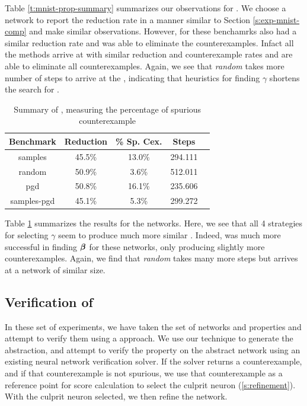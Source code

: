 Table \ref{t:mnist-prop-summary} summarizes our observations for \mnist. We
choose a network to report the reduction rate in a manner similar to Section
\ref{s:exp-mnist-comp} and make similar observations. However, for these benchamrks 
\pgd also had a similar reduction rate and was able to eliminate the
counterexamples. Infact all the methods arrive at
\abs with similar reduction and counterexample rates and are able to eliminate all
counterexamples. Again, we see that \textit{random} takes more number of steps
to arrive at the \abs, indicating that heuristics for finding $\gamma$ shortens
the search for \abs.

\begin{table}
\begin{tabular}{|c|c|c|c|c|}
\hline
Benchmark   & Reduction  & \% Sp. Cex. & Steps    \\
\hline
samples     & 45.5\%     &  13.0\%     & 294.111  \\
random      & 50.9\%     &  3.6\%      & 512.011  \\
pgd         & 50.8\%     &  16.1\%     & 235.606  \\
samples-pgd & 45.1\%     &  5.3\%      & 299.272  \\
\hline
\end{tabular}
\caption{Summary of \acasxu, measuring the percentage of spurious counterexample }
\label{t:acas-ncex}
\end{table}

Table \ref{t:acas-ncex} summarizes the results for the \acasxu networks. Here,
we see that all 4 strategies for selecting $\gamma$ seem to produce much more
similar \abs. Indeed, \pgd was much more successful in finding
$\boldsymbol{\beta}$ for these networks, only producing slightly more counterexamples.
Again, we find that \textit{random} takes many more steps but arrives at a
network of similar size.

\subsection{Verification of \acasxu}
\label{s:acas-verif}

In these set of experiments, we have taken the \acasxu set of
networks and properties and attempt to verify them using a \cegar approach. We
use our technique to generate the abstraction, and attempt to verify the
property on the abstract network using an existing neural network verification
solver. If the solver returns a counterexample, and if that counterexample is
not spurious, we use that counterexample as a reference point for score
calculation  to select the culprit neuron (\ref{s:refinement}). With the culprit
neuron selected, we then refine the network.

